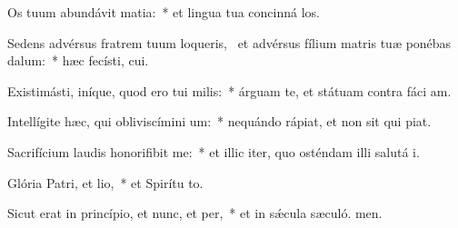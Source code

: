 \item Os tuum abundávit matia:~* et lingua tua concinná los.
\item Sedens advérsus fratrem tuum loqueris,~\pscross{} et advérsus fílium matris tuæ ponébas dalum:~* hæc fecísti,  cui.
\item Existimásti, iníque, quod ero tui milis:~* árguam te, et státuam contra fáci am.
\item Intellígite hæc, qui obliviscímini um:~* nequándo rápiat, et non sit qui piat.
\item Sacrifícium laudis honorifibit me:~* et illic iter, quo osténdam illi salutá i.
\item Glória Patri, et lio,~* et Spirítu to.
\item Sicut erat in princípio, et nunc, et per,~* et in sǽcula sæculó. men.
